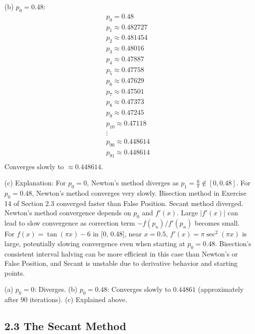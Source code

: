 \begin{enumerate}
    (b) \( p_0 = 0.48 \):
    \[
      \begin{array}{l}
        p_0 = 0.48 \\
        p_1 \approx 0.482727 \\
        p_2 \approx 0.481454 \\
        p_3 \approx 0.48016 \\
        p_4 \approx 0.47887 \\
        p_5 \approx 0.47758 \\
        p_6 \approx 0.47629 \\
        p_7 \approx 0.47501 \\
        p_8 \approx 0.47373 \\
        p_9 \approx 0.47245 \\
        p_{10} \approx 0.47118 \\
        \vdots \\
        p_{90} \approx 0.448614 \\
        p_{91} \approx 0.448614 \\
      \end{array}
    \]
    Converges slowly to \( \approx 0.448614 \).

    (c) Explanation:
    For \( p_0 = 0 \), Newton's method diverges as \( p_1 =
    \frac{6}{\pi} \notin [0, 0.48] \).
    For \( p_0 = 0.48 \), Newton's method converges very slowly.
    Bisection method in Exercise 14 of Section 2.3 converged faster
    than False Position. Secant method diverged.
    Newton's method convergence depends on \( p_0 \) and \( f'(x) \).
    Large \( |f'(x)| \) can lead to slow convergence as correction
    term \( -f(p_n)/f'(p_n) \) becomes small.
    For \( f(x) = \tan(\pi x) - 6 \) in [0, 0.48], near \( x = 0.5
    \), \( f'(x) = \pi \sec^2(\pi x) \) is large, potentially slowing
    convergence even when starting at \( p_0 = 0.48 \). Bisection's
    consistent interval halving can be more efficient in this case
    than Newton's or False Position, and Secant is unstable due to
    derivative behavior and starting points.

    (a) \( p_0 = 0 \): Diverges.
    (b) \( p_0 = 0.48 \): Converges slowly to \( \boxed{0.44861} \)
    (approximately after 90 iterations).
    (c) Explained above.
\end{enumerate}

\subsection*{2.3 The Secant Method}

